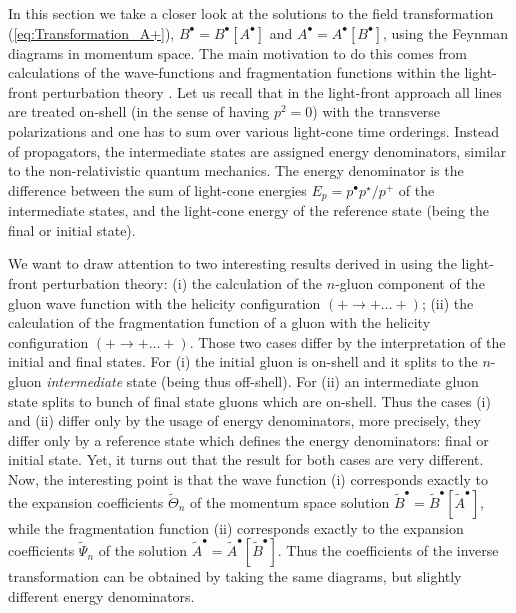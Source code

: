 \documentclass[english,american]{article}
\begin{document}
In this section we take a closer look at the solutions to the field
transformation (\ref{eq:Transformation_A+}), $B^{\bullet}=B^{\bullet}\left[A^{\bullet}\right]$
and $A^{\bullet}=A^{\bullet}\left[B^{\bullet}\right]$, using the Feynman
diagrams in momentum space. The main motivation to do this comes from
 calculations of the wave-functions and fragmentation functions \citep{Motyka2009}  within the light-front perturbation
theory \citep{Kogut1970,Brodsky1998}. Let us recall that in the light-front approach all lines
are treated on-shell (in the sense of having $p^{2}=0$) with the
transverse polarizations and one has to sum over various light-cone
time orderings. Instead of propagators, the intermediate states are
assigned energy denominators, similar to the non-relativistic quantum
mechanics. The energy denominator is the difference between the sum of light-cone energies $E_p=p^{\bullet} p^{\star}/p^+$ of the intermediate states, and the light-cone energy of the reference state (being the final or initial state).

We want to draw attention to two interesting results derived in \citep{Motyka2009}
using the light-front perturbation theory: (i) the calculation of the
$n$-gluon component of the gluon wave function with the helicity configuration
$\left(+\rightarrow+\dots+\right)$; (ii) the calculation of the fragmentation
function of a gluon with the helicity configuration $\left(+\rightarrow+\dots+\right)$.
Those two cases differ by the interpretation of the initial and final
states. For (i) the initial gluon is on-shell and it splits to the $n$-gluon
\textit{intermediate} state (being thus off-shell). For (ii) an intermediate
gluon state splits to bunch of final state gluons which are on-shell.
Thus the cases (i) and (ii) differ only by the usage of energy denominators,
more precisely, they differ only by a reference state which defines
the energy denominators: final or initial state. Yet, it turns out
that the result for both cases are very different. Now, the interesting
point is that the wave function (i) corresponds exactly to the expansion
coefficients $\tilde{\Theta}_{n}$ of the momentum space solution
$\tilde{B}^{\bullet}=\tilde{B}^{\bullet}\left[\tilde{A}^{\bullet}\right]$,
while the fragmentation function (ii) corresponds exactly to the expansion
coefficients $\tilde{\Psi}_{n}$ of the solution $\tilde{A}^{\bullet}=\tilde{A}^{\bullet}\left[\tilde{B}^{\bullet}\right]$.
Thus the coefficients of the inverse transformation can be obtained
by taking the same diagrams, but slightly different energy denominators. 
\end{document}
